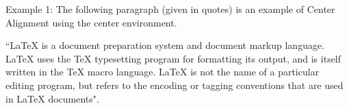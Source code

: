 \documentclass{article}
\begin{document}
\begin{center}
Example 1: The following paragraph (given in quotes) is an example of Center Alignment using the center environment.


``LaTeX is a document preparation system and document markup language. LaTeX uses the TeX typesetting program for formatting its output, and is itself written in the TeX macro language. 
LaTeX is not the name of a particular editing program, but refers to the encoding or tagging conventions that are used in LaTeX documents".

\end{center}
\end{document}
